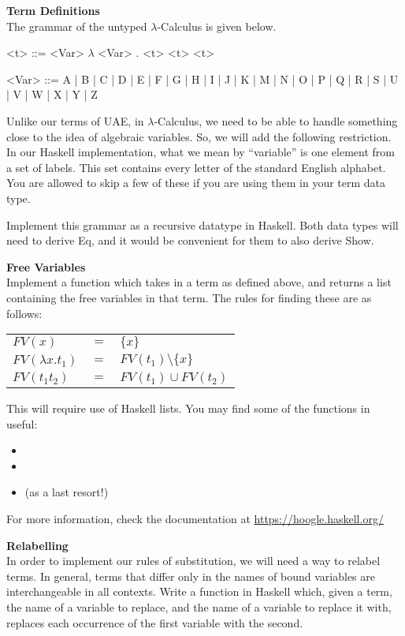 \documentclass{exam}
\let\OldTexttt\texttt
\renewcommand{\texttt}[1]{\OldTexttt{\color{teal}{#1}}}
\begin{document}
\begin{questions}
\question[5] \textbf{Term Definitions} \\
The grammar of the untyped $\lambda$-Calculus is given below.

\begin{grammar}
<t> ::= <Var> 
\alt $\lambda$ <Var> . <t>
\alt <t> <t> 

<Var> ::= A | B | C | D | E | F | G | H | I | J | K | M | N | O | P | Q | R | S | U | V | W | X | Y | Z
\end{grammar}

Unlike our terms of UAE, in $\lambda$-Calculus, we need to be able to handle something close to the idea of algebraic variables.  So, we will add the following restriction.  In our Haskell implementation, what we mean by ``variable'' is one element from a set of labels.  This set contains every letter of the standard English alphabet.  You are allowed to skip a few of these if you are using them in your term data type.

Implement this grammar as a recursive datatype in Haskell.  Both data types will need to derive Eq, and it would be convenient for them to also derive Show.

\question[5] \textbf{Free Variables} \\ 
Implement a function which takes in a term as defined above, and returns a list containing the free variables in that term.  The rules for finding these are as follows:

\begin{tabular}{l l l}
$FV(x)$ & $=$ & $\{x\}$ \\
$FV(\lambda x. t_1)$ & $=$ & $FV(t_1) \setminus \{x\}$ \\ 
$FV(t_1 t_2)$ & $=$ & $FV(t_1) \cup FV(t_2)$ \\
\end{tabular}

This will require use of Haskell lists.  You may find some of the functions in \texttt{Data.List} useful:
\begin{itemize}
\item \texttt{union}
\item \texttt{\textbackslash \textbackslash}
\item \texttt{nub} (as a last resort!)
\end{itemize}

For more information, check the documentation at \url{https://hoogle.haskell.org/}

\question[5] \textbf{Relabelling} \\
In order to implement our rules of substitution, we will need a way to relabel terms.  In general, terms that differ only in the names of bound variables are interchangeable in all contexts.  Write a function in Haskell which, given a term, the name of a variable to replace, and the name of a variable to replace it with, replaces each occurrence of the first variable with the second.  \\


\end{questions}
\end{document}
